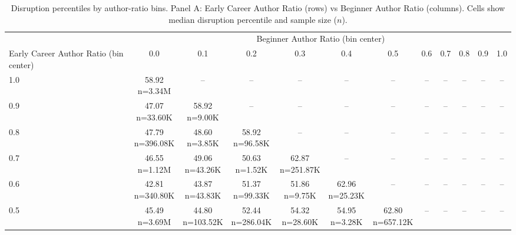\begin{table}\centering
            \caption{Disruption percentiles by author-ratio bins. Panel A: Early Career Author Ratio (rows) vs Beginner Author Ratio (columns). Cells show median disruption percentile and sample size ($n$).}
            \scriptsize
            \setlength\tabcolsep{4pt}
            \renewcommand{\arraystretch}{1.1}
            \begin{tabular}{lccccccccccc}
            \toprule
            & \multicolumn{11}{c}{Beginner Author Ratio (bin center)} \\
            \cmidrule(lr){2-12}
            Early Career Author Ratio (bin center) & 0.0 & 0.1 & 0.2 & 0.3 & 0.4 & 0.5 & 0.6 & 0.7 & 0.8 & 0.9 & 1.0 \\
            \midrule
            1.0 & \makecell{58.92 \\ \scriptsize n=3.34M} & -- & -- & -- & -- & -- & -- & -- & -- & -- & -- \\
0.9 & \makecell{47.07 \\ \scriptsize n=33.60K} & \makecell{58.92 \\ \scriptsize n=9.00K} & -- & -- & -- & -- & -- & -- & -- & -- & -- \\
0.8 & \makecell{47.79 \\ \scriptsize n=396.08K} & \makecell{48.60 \\ \scriptsize n=3.85K} & \makecell{58.92 \\ \scriptsize n=96.58K} & -- & -- & -- & -- & -- & -- & -- & -- \\
0.7 & \makecell{46.55 \\ \scriptsize n=1.12M} & \makecell{49.06 \\ \scriptsize n=43.26K} & \makecell{50.63 \\ \scriptsize n=1.52K} & \makecell{62.87 \\ \scriptsize n=251.87K} & -- & -- & -- & -- & -- & -- & -- \\
0.6 & \makecell{42.81 \\ \scriptsize n=340.80K} & \makecell{43.87 \\ \scriptsize n=43.83K} & \makecell{51.37 \\ \scriptsize n=99.33K} & \makecell{51.86 \\ \scriptsize n=9.75K} & \makecell{62.96 \\ \scriptsize n=25.23K} & -- & -- & -- & -- & -- & -- \\
0.5 & \makecell{45.49 \\ \scriptsize n=3.69M} & \makecell{44.80 \\ \scriptsize n=103.52K} & \makecell{52.44 \\ \scriptsize n=286.04K} & \makecell{54.32 \\ \scriptsize n=28.60K} & \makecell{54.95 \\ \scriptsize n=3.28K} & \makecell{62.80 \\ \scriptsize n=657.12K} & -- & -- & -- & -- & -- \\

\end{tabular}
\end{table}
